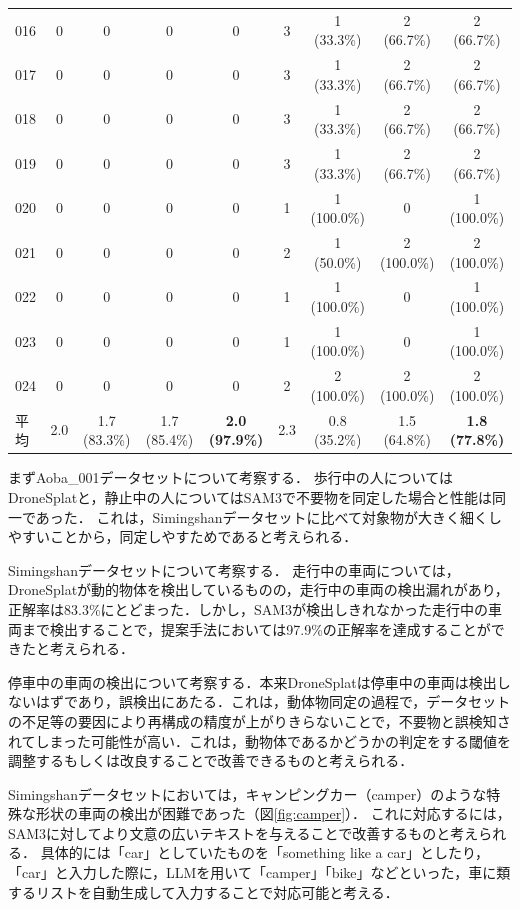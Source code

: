 \documentclass[a4paper,dvipdfmx,ja=standard,9pt]{bxjsarticle}
\begin{document}
\begin{table}[htbp]
\begin{tabular}{lcccccccc}
    016 & 0 & 0 & 0 & 0 & 3 & 1 (33.3\%) & 2 (66.7\%) & 2 (66.7\%) \\
    017 & 0 & 0 & 0 & 0 & 3 & 1 (33.3\%) & 2 (66.7\%) & 2 (66.7\%) \\
    018 & 0 & 0 & 0 & 0 & 3 & 1 (33.3\%) & 2 (66.7\%) & 2 (66.7\%) \\
    019 & 0 & 0 & 0 & 0 & 3 & 1 (33.3\%) & 2 (66.7\%) & 2 (66.7\%) \\
    020 & 0 & 0 & 0 & 0 & 1 & 1 (100.0\%) & 0 & 1 (100.0\%) \\
    021 & 0 & 0 & 0 & 0 & 2 & 1 (50.0\%) & 2 (100.0\%) & 2 (100.0\%) \\
    022 & 0 & 0 & 0 & 0 & 1 & 1 (100.0\%) & 0 & 1 (100.0\%) \\
    023 & 0 & 0 & 0 & 0 & 1 & 1 (100.0\%) & 0 & 1 (100.0\%) \\
    024 & 0 & 0 & 0 & 0 & 2 & 2 (100.0\%) & 2 (100.0\%) & 2 (100.0\%) \\
    \midrule
    平均 & 2.0 & 1.7 (83.3\%) & 1.7 (85.4\%) & \textbf{2.0 (97.9\%)} & 2.3 & 0.8 (35.2\%) & 1.5 (64.8\%) & \textbf{1.8 (77.8\%)} \\
    \bottomrule
  \end{tabular}
  \label{tab:detection_comparison}
\end{table}
\FloatBarrier

まずAoba\_001データセットについて考察する．
歩行中の人についてはDroneSplatと，静止中の人についてはSAM3で不要物を同定した場合と性能は同一であった．
これは，Simingshanデータセットに比べて対象物が大きく細くしやすいことから，同定しやすためであると考えられる．

Simingshanデータセットについて考察する．
走行中の車両については，DroneSplatが動的物体を検出しているものの，走行中の車両の検出漏れがあり，正解率は83.3\%にとどまった．しかし，SAM3が検出しきれなかった走行中の車両まで検出することで，提案手法においては97.9\%の正解率を達成することができたと考えられる．

停車中の車両の検出について考察する．本来DroneSplatは停車中の車両は検出しないはずであり，誤検出にあたる．これは，動体物同定の過程で，データセットの不足等の要因により再構成の精度が上がりきらないことで，不要物と誤検知されてしまった可能性が高い．これは，動物体であるかどうかの判定をする閾値を調整するもしくは改良することで改善できるものと考えられる．

Simingshanデータセットにおいては，キャンピングカー（camper）のような特殊な形状の車両の検出が困難であった（図\ref{fig:camper}）．
これに対応するには，SAM3に対してより文意の広いテキストを与えることで改善するものと考えられる．
具体的には「car」としていたものを「something like a car」としたり，「car」と入力した際に，LLMを用いて「camper」「bike」などといった，車に類するリストを自動生成して入力することで対応可能と考える．
\end{document}

